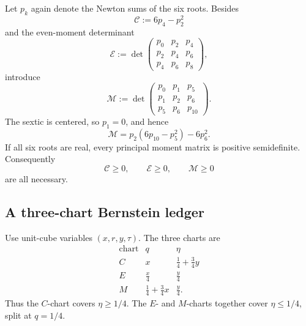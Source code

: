 \documentclass[11pt]{article}
\theoremstyle{definition}
\theoremstyle{remark}
\begin{document}
Let \(p_k\) again denote the Newton sums of the six roots.  Besides
\[
 \mathcal C:=6p_4-p_2^2
 \tag{N21.6}
\]
and the even-moment determinant
\[
 \mathcal E:=
 \det\!\begin{pmatrix}
 p_0&p_2&p_4\\
 p_2&p_4&p_6\\
 p_4&p_6&p_8
 \end{pmatrix},
 \tag{N21.7}
\]
introduce
\[
 \mathcal M:=
 \det\!\begin{pmatrix}
 p_0&p_1&p_5\\
 p_1&p_2&p_6\\
 p_5&p_6&p_{10}
 \end{pmatrix}.
 \tag{N21.8}
\]
The sextic is centered, so \(p_1=0\), and hence
\[
 \mathcal M=p_2(6p_{10}-p_5^2)-6p_6^2.
 \tag{N21.9}
\]
If all six roots are real, every principal moment matrix is positive
semidefinite.  Consequently
\[
 \mathcal C\geq0,\qquad \mathcal E\geq0,\qquad
 \mathcal M\geq0
 \tag{N21.10}
\]
are all necessary.

\subsection{A three-chart Bernstein ledger}
\label{subsec:f2v21-ledger}

Use unit-cube variables \((x,r,y,\tau)\).  The three charts are
\[
\begin{array}{c|c|c}
\text{chart}&q&\eta\\ \hline
C&x&\displaystyle\frac14+\frac34y\\[1mm]
E&\displaystyle\frac x4&\displaystyle\frac y4\\[1mm]
M&\displaystyle\frac14+\frac34x&\displaystyle\frac y4 .
\end{array}
\tag{N21.11}
\]
Thus the \(C\)-chart covers \(\eta\geq1/4\).  The \(E\)- and \(M\)-charts
together cover \(\eta\leq1/4\), split at \(q=1/4\).
\end{document}

